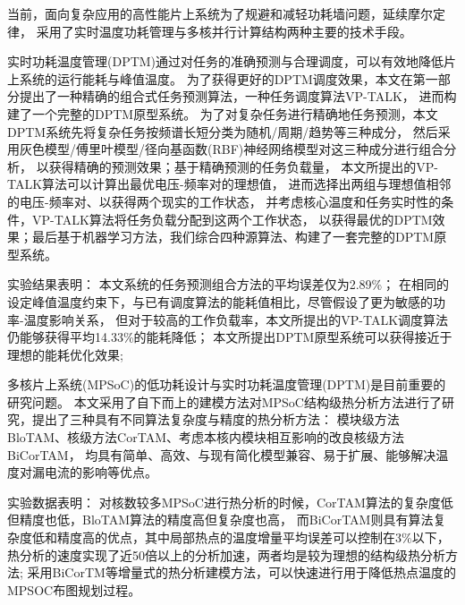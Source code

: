 

{}

\makeatother



\begin{cabstract}

当前，面向复杂应用的高性能片上系统为了规避和减轻功耗墙问题，延续摩尔定律， 采用了实时温度功耗管理与多核并行计算结构两种主要的技术手段。


实时功耗温度管理(DPTM)通过对任务的准确预测与合理调度，可以有效地降低片上系统的运行能耗与峰值温度。 为了获得更好的DPTM调度效果，本文在第一部分提出了一种精确的组合式任务预测算法，一种任务调度算法VP-TALK， 进而构建了一个完整的DPTM原型系统。 为了对复杂任务进行精确地任务预测，本文DPTM系统先将复杂任务按频谱长短分类为随机/周期/趋势等三种成分， 然后采用灰色模型/傅里叶模型/径向基函数(RBF)神经网络模型对这三种成分进行组合分析， 以获得精确的预测效果；基于精确预测的任务负载量， 本文所提出的VP-TALK算法可以计算出最优电压-频率对的理想值， 进而选择出两组与理想值相邻的电压-频率对、以获得两个现实的工作状态， 并考虑核心温度和任务实时性的条件，VP-TALK算法将任务负载分配到这两个工作状态， 以获得最优的DPTM效果；最后基于机器学习方法，我们综合四种源算法、构建了一套完整的DPTM原型系统。

实验结果表明：
本文系统的任务预测组合方法的平均误差仅为2.89\%；
在相同的设定峰值温度约束下，与已有调度算法的能耗值相比，尽管假设了更为敏感的功率-温度影响关系， 但对于较高的工作负载率，本文所提出的VP-TALK调度算法仍能够获得平均14.33\%的能耗降低；
本文所提出DPTM原型系统可以获得接近于理想的能耗优化效果;


多核片上系统(MPSoC)的低功耗设计与实时功耗温度管理(DPTM)是目前重要的研究问题。 本文采用了自下而上的建模方法对MPSoC结构级热分析方法进行了研究，提出了三种具有不同算法复杂度与精度的热分析方法： 模块级方法BloTAM、核级方法CorTAM、考虑本核内模块相互影响的改良核级方法BiCorTAM， 均具有简单、高效、与现有简化模型兼容、易于扩展、能够解决温度对漏电流的影响等优点。

实验数据表明：
对核数较多MPSoC进行热分析的时候，CorTAM算法的复杂度低但精度也低，BloTAM算法的精度高但复杂度也高， 而BiCorTAM则具有算法复杂度低和精度高的优点，其中局部热点的温度增量平均误差可以控制在3\%以下， 热分析的速度实现了近50倍以上的分析加速，两者均是较为理想的结构级热分析方法;
采用BiCorTM等增量式的热分析建模方法，可以快速进行用于降低热点温度的MPSOC布图规划过程。


\end{cabstract}

